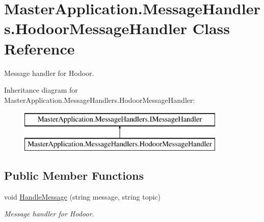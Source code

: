 \hypertarget{class_master_application_1_1_message_handlers_1_1_hodoor_message_handler}{}\section{Master\+Application.\+Message\+Handlers.\+Hodoor\+Message\+Handler Class Reference}
\label{class_master_application_1_1_message_handlers_1_1_hodoor_message_handler}


Message handler for Hodoor.  


Inheritance diagram for Master\+Application.\+Message\+Handlers.\+Hodoor\+Message\+Handler\+:\begin{figure}[H]
\begin{center}
\leavevmode
\includegraphics[height=2.000000cm]{class_master_application_1_1_message_handlers_1_1_hodoor_message_handler}
\end{center}
\end{figure}
\subsection*{Public Member Functions}
\begin{DoxyCompactItemize}
\item 
void \mbox{\hyperlink{class_master_application_1_1_message_handlers_1_1_hodoor_message_handler_ae3bb33c825a5f9ca7941e56fe25cc3ae}{Handle\+Message}} (string message, string topic)
\begin{DoxyCompactList}\small\item\em Message handler for Hodoor. \end{DoxyCompactList}\end{DoxyCompactItemize}
